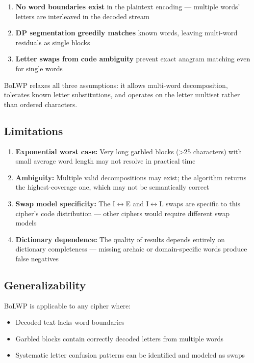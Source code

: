 \documentclass[11pt,a4paper]{article}
\begin{document}
\begin{enumerate}
\item \textbf{No word boundaries exist} in the plaintext encoding --- multiple words' letters are interleaved in the decoded stream
\item \textbf{DP segmentation greedily matches} known words, leaving multi-word residuals as single blocks
\item \textbf{Letter swaps from code ambiguity} prevent exact anagram matching even for single words
\end{enumerate}

BoLWP relaxes all three assumptions: it allows multi-word decomposition, tolerates known letter substitutions, and operates on the letter multiset rather than ordered characters.

\subsection{Limitations}

\begin{enumerate}
\item \textbf{Exponential worst case:} Very long garbled blocks (>25 characters) with small average word length may not resolve in practical time
\item \textbf{Ambiguity:} Multiple valid decompositions may exist; the algorithm returns the highest-coverage one, which may not be semantically correct
\item \textbf{Swap model specificity:} The I$\leftrightarrow$E and I$\leftrightarrow$L swaps are specific to this cipher's code distribution --- other ciphers would require different swap models
\item \textbf{Dictionary dependence:} The quality of results depends entirely on dictionary completeness --- missing archaic or domain-specific words produce false negatives
\end{enumerate}

\subsection{Generalizability}

BoLWP is applicable to any cipher where:
\begin{itemize}
\item Decoded text lacks word boundaries
\item Garbled blocks contain correctly decoded letters from multiple words
\item Systematic letter confusion patterns can be identified and modeled as swaps
\end{itemize}
\end{document}
